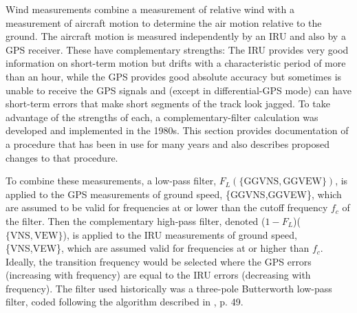 \documentclass[12pt,twoside,english]{article}\usepackage[]{graphicx}\usepackage[]{color}
\let\OrgIndex\index
\renewcommand*{\index}[1]{\OrgIndex{#1}}
\begin{document}
Wind measurements combine a measurement of relative wind with a measurement  of aircraft motion to determine the air motion relative to the ground. The aircraft motion is measured independently by an IRU and also by a GPS receiver. These have complementary strengths: The IRU provides very good information on short-term motion but drifts with a characteristic period of more than an hour, while the GPS provides good absolute accuracy but sometimes is unable to receive the GPS signals and (except in differential-GPS mode) can have short-term errors that make short segments of the track look jagged. To take advantage of the strengths of each, a complementary-filter calculation was developed and implemented in the 1980s. This section provides documentation of a procedure that has been in use for many years and also describes proposed changes to that procedure.

To combine these measurements, a low-pass filter, $F_{L}(\{\mathrm{GGVNS,GGVEW\}})$, is applied to the GPS measurements of ground speed, \{GGVNS,GGVEW\}, which are assumed to be valid for frequencies at or lower than the cutoff frequency $f_{c}$ of the filter. Then the complementary high-pass filter, denoted ($1-F_{L}$)($\{\mathrm{VNS,VEW\}}$), is applied to the IRU measurements of ground speed, \{VNS,VEW\}, which are assumed valid for frequencies at or higher than $f_{c}$. Ideally, the transition frequency would be selected where the GPS errors (increasing with frequency) are equal to the IRU errors (decreasing with frequency). The filter used historically was a three-pole Butterworth low-pass filter, coded following the algorithm described in \citet{Bozic1980}, p. 49. 
\end{document}

